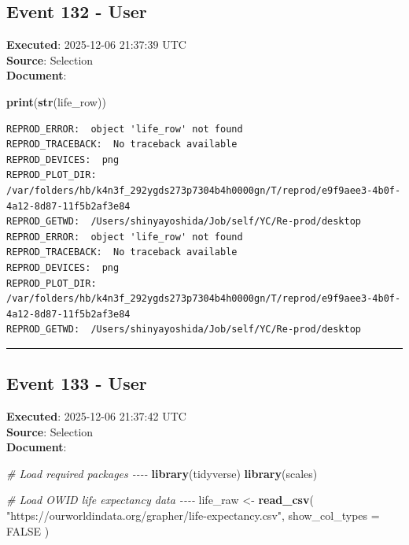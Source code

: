 \documentclass[
  11pt,
]{article}
\newenvironment{Shaded}{\begin{snugshade}}{\end{snugshade}}
\newcommand{\AttributeTok}[1]{\textcolor[rgb]{0.13,0.29,0.53}{#1}}
\newcommand{\CommentTok}[1]{\textcolor[rgb]{0.56,0.35,0.01}{\textit{#1}}}
\newcommand{\ConstantTok}[1]{\textcolor[rgb]{0.56,0.35,0.01}{#1}}
\newcommand{\FunctionTok}[1]{\textcolor[rgb]{0.13,0.29,0.53}{\textbf{#1}}}
\newcommand{\NormalTok}[1]{#1}
\newcommand{\OtherTok}[1]{\textcolor[rgb]{0.56,0.35,0.01}{#1}}
\newcommand{\StringTok}[1]{\textcolor[rgb]{0.31,0.60,0.02}{#1}}
\newenvironment{rpoutput}{\vspace{0.5em}\begin{snugshade}}{\end{snugshade}}
\begin{document}
\subsection{Event 132 - User}\label{event-132---user}

\textbf{Executed}: 2025-12-06 21:37:39 UTC\\
\textbf{Source}: Selection\\
\textbf{Document}:

\begin{Shaded}
\begin{Highlighting}[]
\FunctionTok{print}\NormalTok{(}\FunctionTok{str}\NormalTok{(life\_row))}
\end{Highlighting}
\end{Shaded}

\begin{rpoutput}

\begin{verbatim}
REPROD_ERROR:  object 'life_row' not found 
REPROD_TRACEBACK:  No traceback available  
REPROD_DEVICES:  png 
REPROD_PLOT_DIR:  /var/folders/hb/k4n3f_292ygds273p7304b4h0000gn/T/reprod/e9f9aee3-4b0f-4a12-8d87-11f5b2af3e84 
REPROD_GETWD:  /Users/shinyayoshida/Job/self/YC/Re-prod/desktop 
REPROD_ERROR:  object 'life_row' not found 
REPROD_TRACEBACK:  No traceback available  
REPROD_DEVICES:  png 
REPROD_PLOT_DIR:  /var/folders/hb/k4n3f_292ygds273p7304b4h0000gn/T/reprod/e9f9aee3-4b0f-4a12-8d87-11f5b2af3e84 
REPROD_GETWD:  /Users/shinyayoshida/Job/self/YC/Re-prod/desktop 
\end{verbatim}

\end{rpoutput}

\begin{center}\rule{0.5\linewidth}{0.5pt}\end{center}

\subsection{Event 133 - User}\label{event-133---user}

\textbf{Executed}: 2025-12-06 21:37:42 UTC\\
\textbf{Source}: Selection\\
\textbf{Document}:

\begin{Shaded}
\begin{Highlighting}[]
\CommentTok{\# Load required packages {-}{-}{-}{-}}
\FunctionTok{library}\NormalTok{(tidyverse)}
\FunctionTok{library}\NormalTok{(scales)}

\CommentTok{\# Load OWID life expectancy data {-}{-}{-}{-}}
\NormalTok{life\_raw }\OtherTok{\textless{}{-}} \FunctionTok{read\_csv}\NormalTok{(}
  \StringTok{"https://ourworldindata.org/grapher/life{-}expectancy.csv"}\NormalTok{,}
  \AttributeTok{show\_col\_types =} \ConstantTok{FALSE}
\NormalTok{)}
\end{Highlighting}
\end{Shaded}
\end{document}
